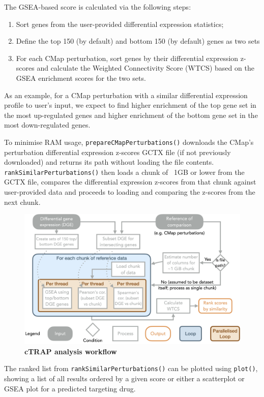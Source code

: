 The GSEA-based score is calculated via the following steps:

\begin{enumerate}
	\item Sort genes from the user-provided differential expression statistics;
	\item Define the top 150 (by default) and bottom 150 (by default) genes as two sets
	\item For each CMap perturbation, sort genes by their differential expression z-scores and calculate the Weighted Connectivity Score (WTCS) \cite{subramanian:2017ul} based on the GSEA enrichment scores for the two sets.
\end{enumerate}

As an example, for a CMap perturbation with a similar differential expression profile to user’s input, we expect to find higher enrichment of the top gene set in the most up-regulated genes and higher enrichment of the bottom gene set in the most down-regulated genes.

To minimise RAM usage, \texttt{prepareCMapPerturbations()} downloads the CMap’s perturbation differential expression z-scores GCTX file (if not previously downloaded) and returns its path without loading the file contents. \texttt{rankSimilarPerturbations()} then loads a chunk of ~1GB or lower from the GCTX file, compares the differential expression z-scores from that chunk against user-provided data and proceeds to loading and comparing the z-scores from the next chunk.

\begin{figure}[!h]
  \includegraphics[width=.8\textwidth]{images/ctrap/analysis}
  \centering
  \caption[cTRAP analysis workflow]{\textbf{cTRAP analysis workflow}}
  \label{fig:ctrap-analysis}
\end{figure}

The ranked list from \texttt{rankSimilarPerturbations()} can be plotted using \texttt{plot()}, showing a list of all results ordered by a given score or either a scatterplot or GSEA plot for a predicted targeting drug.

